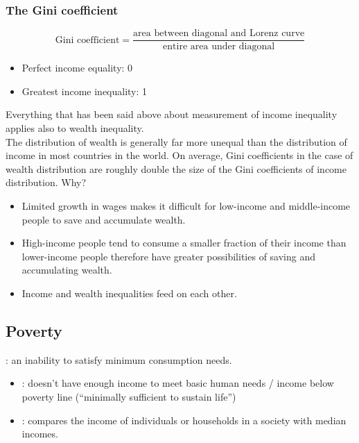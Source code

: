 \subsubsection*{The Gini coefficient}
$$\text{Gini coefficient}=\dfrac{\text{area between diagonal and Lorenz curve}}{\text{entire area under diagonal}}$$
\begin{itemize}
  \item Perfect income equality: 0
  \item Greatest income inequality: 1
\end{itemize}
Everything that has been said above about measurement of income inequality applies also to wealth inequality.\\
The distribution of wealth is generally far more unequal than the distribution of income in most countries in the world. On average, Gini coefficients in the case of wealth distribution are roughly double the size of the Gini coefficients of income distribution. Why?
\begin{itemize}
  \item Limited growth in wages makes it difficult for low-income and middle-income people to save and accumulate wealth.
  \item High-income people tend to consume a smaller fraction of their income than lower-income people therefore have greater possibilities of saving and accumulating wealth.
  \item Income and wealth inequalities feed on each other.
\end{itemize}
\subsection{Poverty}
: an inability to satisfy minimum consumption needs.
\begin{itemize}
  \item {}: doesn't have enough income to meet basic human needs / income below poverty line (``minimally sufficient to sustain life'')
  \item {}: compares the income of individuals or households in a society with median incomes.
\end{itemize}
